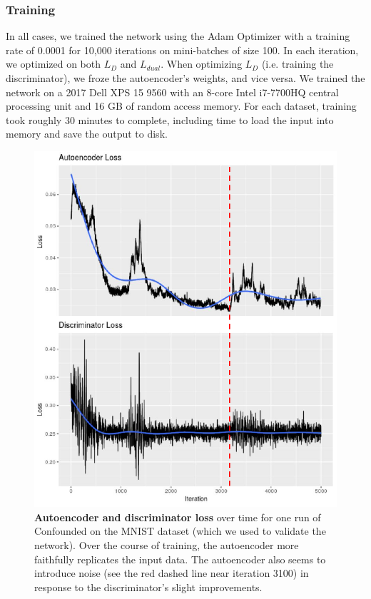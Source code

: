 \documentclass[11pt]{article}
\begin{document}
\subsubsection{Training}

In all cases, we trained the network using the Adam Optimizer \citep{kingma_adam_2014} with a training rate of 0.0001 for 10,000 iterations on mini-batches of size 100.
In each iteration, we optimized on both $L_D$ and $L_{dual}$.
When optimizing $L_D$ (i.e. training the discriminator), we froze the autoencoder's weights, and vice versa.
We trained the network on a 2017 Dell XPS 15 9560 with an 8-core Intel i7-7700HQ central processing unit and 16 GB of random access memory.
For each dataset, training took roughly 30 minutes to complete, including time to load the input into memory and save the output to disk.

\begin{figure}
	\centering
	\includegraphics[width=\columnwidth]{figures/final/training_loss.pdf}
	\caption[Autoencoder and discriminator loss]{\textbf{Autoencoder and discriminator loss} over time for one run of Confounded on the MNIST dataset (which we used to validate the network).
	Over the course of training, the autoencoder more faithfully replicates the input data.
	The autoencoder also seems to introduce noise (see the red dashed line near iteration 3100) in response to the discriminator's slight improvements.}
	\label{fig:training_loss}
\end{figure}
\end{document}
